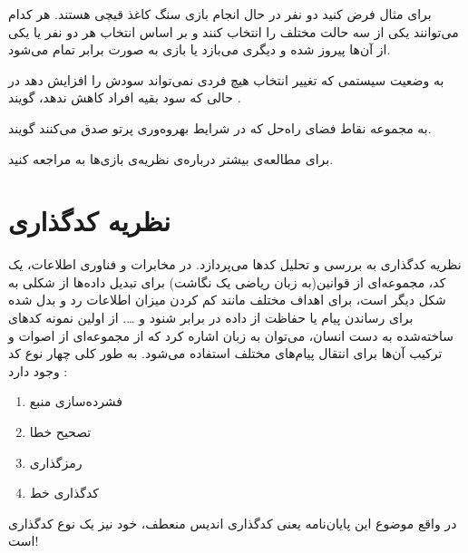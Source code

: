 برای مثال فرض کنید دو نفر در حال انجام بازی سنگ کاغذ قیچی هستند. هر کدام می‌توانند یکی از سه حالت مختلف را انتخاب کنند و بر اساس انتخاب هر دو نفر یا یکی از آن‌ها پیروز شده و دیگری می‌بازد یا بازی به صورت برابر تمام می‌شود.
\begin{definition}
	\label{def:Pareto}
	به وضعیت سیستمی که تغییر انتخاب هیچ فردی نمی‌تواند سودش را افزایش دهد
	در حالی که سود بقیه افراد کاهش ندهد، گویند
	\cite{wiki:pareto}.
	\end{definition}
		\begin{definition}
	\label{def:Pareto-boundary}
	به مجموعه نقاط فضای راه‌حل که در شرایط بهروه‌وری پرتو صدق می‌کنند گویند.
\end{definition}

	برای مطالعه‌ی بیشتر درباره‌ی نظریه‌ی بازی‌ها به
\cite{book:game}
مراجعه کنید.
\section{نظریه کدگذاری}
نظریه کدگذاری به بررسی و تحلیل کد‌ها می‌پردازد. در مخابرات و فناوری اطلاعات، یک کد، مجموعه‌‌ای از قوانین(به زبان ریاضی یک نگاشت‌) برای تبدیل داده‌ها از شکلی به شکل دیگر است، برای اهداف مختلف مانند کم‌ کردن میزان اطلاعات رد و بدل‌‌ شده برای رساندن پیام یا حفاظت از داده در برابر شنود و \dots .
از اولین نمونه‌ کدهای ساخته‌شده به دست انسان، می‌توان به زبان اشاره کرد که از مجموعه‌ای از اصوات و ترکیب آن‌ها برای انتقال پیام‌های مختلف استفاده می‌شود. به طور کلی چهار نوع کد وجود دارد \cite{wiki:coding1, wiki:coding2}:
\begin{enumerate}
	\item فشرده‌سازی منبع
	\item تصحیح خطا
	\item رمزگذاری
	\item کدگذاری خط
\end{enumerate}

در واقع موضوع این پایان‌نامه یعنی کدگذاری اندیس منعطف، خود نیز یک نوع کدگذاری است!

